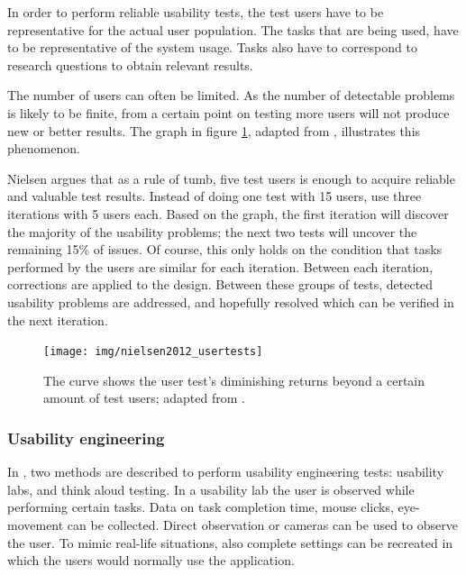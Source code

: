 In order to perform reliable usability tests, the test users have to be representative for the actual user population\cite{duval:2012:chi:evaluation, north:2006}. The tasks that are being used, have to be representative of the system usage. Tasks also have to correspond to research questions to obtain relevant results\cite{snyder:2003}.

The number of users can often be limited. As the number of detectable problems is likely to be finite, from a certain point on testing more users will not produce new or better results\cite{duval:2012:chi:evaluation, nielsen:2012:nngroup:diminishing_returns}. The graph in figure \ref{fig:nielsengraph}, adapted from \cite{nielsen:2012:nngroup:diminishing_returns}, illustrates this phenomenon.

Nielsen argues that as a rule of tumb, five test users is enough to acquire reliable and valuable test results. Instead of doing one test with 15 users, use three iterations with 5 users each. Based on the graph, the first iteration will discover the majority of the usability problems; the next two tests will uncover the remaining 15\% of issues. Of course, this only holds on the condition that tasks performed by the users are similar for each iteration. Between each iteration, corrections are applied to the design\cite{nielsen:2012:nngroup:diminishing_returns}. Between these groups of tests, detected usability problems are addressed, and hopefully resolved which can be verified in the next iteration.

\begin{figure}
	\begin{center}
		\texttt{[image: img/nielsen2012\_usertests]}
	\end{center}
	\caption{The curve shows the user test's diminishing returns beyond a certain amount of test users; adapted from \cite{nielsen:2012:nngroup:diminishing_returns}.}
	\label{fig:nielsengraph}
\end{figure}


\subsubsection{Usability engineering}

In \cite{duval:2012:chi:evaluation}, two methods are described to perform usability engineering tests: usability labs, and think aloud testing. In a usability lab the user is observed while performing certain tasks. Data on task completion time, mouse clicks, eye-movement can be collected. Direct observation or cameras can be used to observe the user. To mimic real-life situations, also complete settings can be recreated in which the users would normally use the application\cite{duval:2012:chi:evaluation}.

